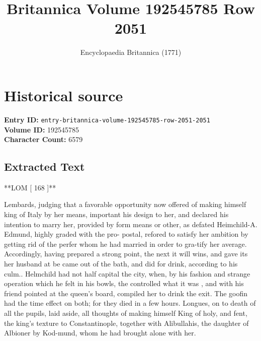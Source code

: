 \documentclass{article}
\title{Britannica Volume 192545785 Row 2051}
\date{Encyclopaedia Britannica (1771)}
\begin{document}
\maketitle

\section*{Historical source}
\textbf{Entry ID:} \texttt{entry-britannica-volume-192545785-row-2051-2051} \\
\textbf{Volume ID:} 192545785 \\
\textbf{Character Count:} 6579

\subsection*{Extracted Text}
**LOM [ 168 ]**

Lembards, judging that a favorable opportunity now offered of making himself king of Italy by her means, important his design to her, and declared his intention to marry her, provided by form means or other, as defated Heimchild-A. Edmund, highly graded with the pro- postal, refored to satisfy her ambition by getting rid of the perfer whom he had married in order to gra-tify her average. Accordingly, having prepared a strong point, the next it will wins, and gave its her husband at be came out of the bath, and did for drink, according to his culm.. Helmchild had not half capital the city, when, by his fashion and strange operation which he felt in his bowls, the controlled what it was , and with his friend pointed at the queen’s board, compiled her to drink the exit. The goofin had the time effect on both; for they died in a few hours. Longues, on to death of all the pupils, laid aside, all thoughts of making himself King of holy, and fent, the king’s texture to Constantinople, together with Alibullahis, the daughter of Albioner by Kod-mund, whom he had brought alone with her.
\end{document}
